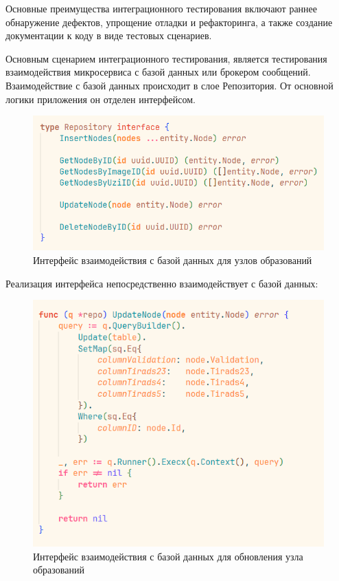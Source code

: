 Основные преимущества интеграционного тестирования включают раннее обнаружение дефектов, упрощение отладки и рефакторинга, а также создание 
документации к коду в виде тестовых сценариев.

Основным сценарием интеграционного тестирования, является тестирования взаимодействия микросервиса с базой данных или брокером сообщений.\\
Взаимодействие с базой данных происходит в слое Репозитория. От основной логики приложения он отделен интерфейсом. 

\begin{figure}[H]%
	\begin{center}
		\includegraphics[width=.7\columnwidth]{./img/new/repository.png}%
	\end{center}
	\caption{Интерфейс взаимодействия с базой данных для узлов образований}%
	\label{pic:repository}%
\end{figure}

Реализация интерфейса непосредственно взаимодействует с базой данных:
\begin{figure}[H]%
	\begin{center}
		\includegraphics[width=.7\columnwidth]{./img/new/repostitory_update.png}%
	\end{center}
	\caption{Интерфейс взаимодействия с базой данных для обновления узла образований}%
	\label{pic:repository_update}%
\end{figure}

